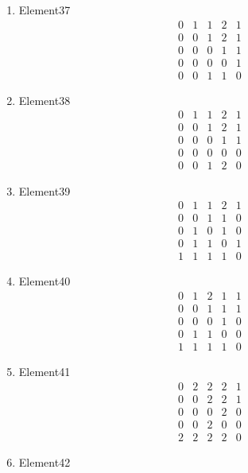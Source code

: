 \documentclass[12pt]{article}
\begin{document}
\begin{multicols}{3}
\begin{enumerate}
\item Element37
\begin{equation*}
\begin{array}{ccccc}
0&1&1&2&1\\
0&0&1&2&1\\
0&0&0&1&1\\
0&0&0&0&1\\
0&0&1&1&0
\end{array}
\end{equation*}
\item Element38
\begin{equation*}
\begin{array}{ccccc}
0&1&1&2&1\\
0&0&1&2&1\\
0&0&0&1&1\\
0&0&0&0&0\\
0&0&1&2&0
\end{array}
\end{equation*}
\item Element39
\begin{equation*}
\begin{array}{ccccc}
0&1&1&2&1\\
0&0&1&1&0\\
0&1&0&1&0\\
0&1&1&0&1\\
1&1&1&1&0
\end{array}
\end{equation*}
\item Element40
\begin{equation*}
\begin{array}{ccccc}
0&1&2&1&1\\
0&0&1&1&1\\
0&0&0&1&0\\
0&1&1&0&0\\
1&1&1&1&0
\end{array}
\end{equation*}
\item Element41
\begin{equation*}
\begin{array}{ccccc}
0&2&2&2&1\\
0&0&2&2&1\\
0&0&0&2&0\\
0&0&2&0&0\\
2&2&2&2&0
\end{array}
\end{equation*}
\item Element42
\begin{equation*}

\end{equation*}
\end{enumerate}
\end{multicols}
\end{document}
